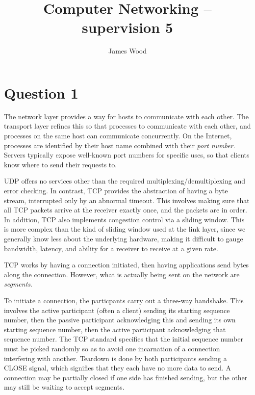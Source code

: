 \documentclass{article}
\begin{document}
\title{Computer Networking -- supervision 5}
\author{James Wood}
\maketitle

\section*{Question 1}
The network layer provides a way for hosts to communicate with each other. The transport layer refines this so that processes to communicate with each other, and processes on the same host can communicate concurrently. On the Internet, processes are identified by their host name combined with their \textit{port number}. Servers typically expose well-known port numbers for specific uses, so that clients know where to send their requests to.

UDP offers no services other than the required multiplexing/demultiplexing and error checking. In contrast, TCP provides the abstraction of having a byte stream, interrupted only by an abnormal timeout. This involves making sure that all TCP packets arrive at the receiver exactly once, and the packets are in order. In addition, TCP also implements congestion control via a sliding window. This is more complex than the kind of sliding window used at the link layer, since we generally know less about the underlying hardware, making it difficult to gauge bandwidth, latency, and ability for a receiver to receive at a given rate.

TCP works by having a connection initiated, then having applications send bytes along the connection. However, what is actually being sent on the network are \textit{segments}.

To initiate a connection, the particpants carry out a three-way handshake. This involves the active participant (often a client) sending its starting sequence number, then the passive participant acknowledging this and sending its own starting sequence number, then the active participant acknowledging that sequence number. The TCP standard specifies that the initial sequence number must be picked randomly so as to avoid one incarnation of a connection interfering with another. Teardown is done by both participants sending a CLOSE signal, which signifies that they each have no more data to send. A connection may be partially closed if one side has finished sending, but the other may still be waiting to accept segments.
\end{document}
